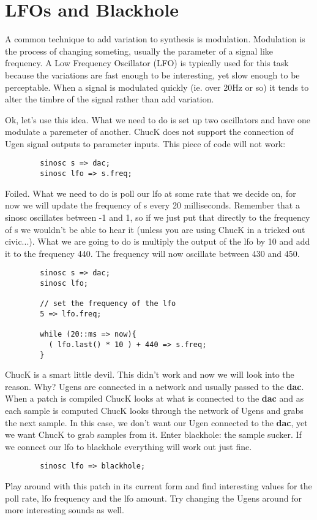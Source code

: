 \section{LFOs and Blackhole}

A common technique to add variation to synthesis is modulation. Modulation is the process of changing someting, usually the parameter of a signal like frequency. A Low Frequency Oscillator (LFO) is typically used for this task because the variations are fast enough to be interesting, yet slow enough to be perceptable. When a signal is modulated quickly (ie. over 20Hz or so) it tends to alter the timbre of the signal rather than add variation. 

Ok, let's use this idea. What we need to do is set up two oscillators and have one modulate a paremeter of another. ChucK does not support the connection of Ugen signal outputs to parameter inputs. This piece of code will not work:

\begin{verbatim}
        sinosc s => dac;
        sinosc lfo => s.freq;
\end{verbatim}

Foiled. What we need to do is poll our lfo at some rate that we decide on, for now we will update the frequency of s every 20 milliseconds. Remember that a sinosc oscillates between -1 and 1, so if we just put that directly to the frequency of s we wouldn't be able to hear it (unless you are using ChucK in a tricked out civic...). What we are going to do is multiply the output of the lfo by 10 and add it to the frequency 440. The frequency will now oscillate between 430 and 450. 

\begin{verbatim}
        sinosc s => dac;
        sinosc lfo;

        // set the frequency of the lfo
        5 => lfo.freq;
    
        while (20::ms => now){
          ( lfo.last() * 10 ) + 440 => s.freq;
        }
\end{verbatim}

ChucK is a smart little devil. This didn't work and now we will look into the reason. Why? Ugens are connected in a network and usually passed to the {\bf dac}. When a patch is compiled ChucK looks at what is connected to the {\bf dac} and as each sample is computed ChucK looks through the network of Ugens and grabs the next sample. In this case, we don't want our Ugen connected to the {\bf dac}, yet we want ChucK to grab samples from it. Enter blackhole: the sample sucker. If we connect our lfo to blackhole everything will work out just fine.

\begin{verbatim}
        sinosc lfo => blackhole;
\end{verbatim}

Play around with this patch in its current form and find interesting values for the poll rate, lfo frequency and the lfo amount. Try changing the Ugens around for more interesting sounds as well. 

